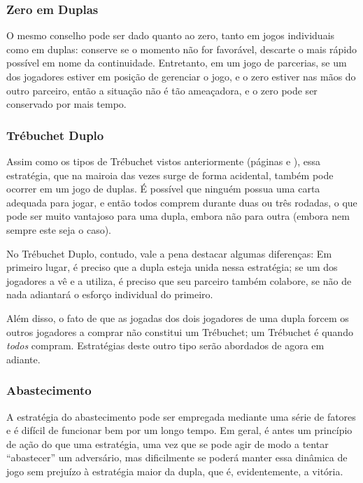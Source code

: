 \subsubsection{Zero em Duplas}

O mesmo conselho pode ser dado quanto ao zero, tanto em jogos individuais como em duplas: conserve se o momento não for favorável, descarte o mais rápido possível em nome da continuidade. Entretanto, em um jogo de parcerias, se um dos jogadores estiver em posição de gerenciar o jogo, e o zero estiver nas mãos do outro parceiro, então a situação não é tão ameaçadora, e o zero pode ser conservado por mais tempo. 

\subsubsection{Trébuchet Duplo}

\label{trebuchetduplo}

Assim como os tipos de Trébuchet vistos anteriormente (páginas \pageref{trebuchetlongo} e \pageref{trebuchetcurto}), essa estratégia, que na mairoia das vezes surge de forma acidental, também pode ocorrer em um jogo de duplas. É possível que ninguém possua uma carta adequada para jogar, e então todos comprem durante duas ou três rodadas, o que pode ser muito vantajoso para uma dupla, embora não para outra (embora nem sempre este seja o caso).

No Trébuchet Duplo, contudo, vale a pena destacar algumas diferenças: Em primeiro lugar, é preciso que a dupla esteja unida nessa estratégia; se um dos jogadores a vê e a utiliza, é preciso que seu parceiro também colabore, se não de nada adiantará o esforço individual do primeiro.

Além disso, o fato de que as jogadas dos dois jogadores de uma dupla forcem os outros jogadores a comprar não constitui um Trébuchet; um Trébuchet é quando \emph{todos} compram. Estratégias deste outro tipo serão abordados de agora em adiante.

\subsubsection{Abastecimento}

A estratégia do abastecimento pode ser empregada mediante uma série de fatores e é difícil de funcionar bem por um longo tempo. Em geral, é antes um princípio de ação do que uma estratégia, uma vez que se pode agir de modo a tentar ``abastecer'' um adversário, mas dificilmente se poderá manter essa dinâmica de jogo sem prejuízo à estratégia maior da dupla, que é, evidentemente, a vitória.

